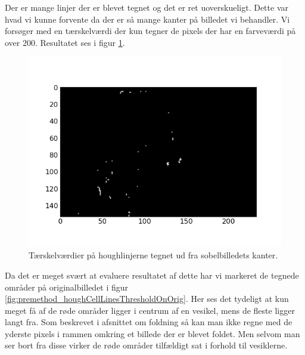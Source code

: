 Der er mange linjer der er blevet tegnet og det er ret uoverskueligt. Dette var hvad vi kunne forvente da der er så mange kanter på billedet vi behandler. Vi forsøger med en tærskelværdi der kun tegner de pixels der har en farveværdi på over 200. Resultatet ses i figur \ref{fig:premethod_houghCellLinesThreshold}.

\begin{figure}[H]
	\centering
	\includegraphics[scale=0.8]{files/premethod/img/houghthreshold.png}
	\caption{Tærskelværdier på houghlinjerne tegnet ud fra sobelbilledets kanter.\label{fig:premethod_houghCellLinesThreshold}}
\end{figure}

Da det er meget svært at evaluere resultatet af dette har vi markeret de tegnede områder på originalbilledet i figur \ref{fig:premethod_houghCellLinesThresholdOnOrig}. Her ses det tydeligt at kun meget få af de røde områder ligger i centrum af en vesikel, mens de fleste ligger langt fra. Som beskrevet i afsnittet om foldning så kan man ikke regne med de yderste pixels i rammen omkring et billede der er blevet foldet. Men selvom man ser bort fra disse virker de røde områder tilfældigt sat i forhold til vesiklerne.

